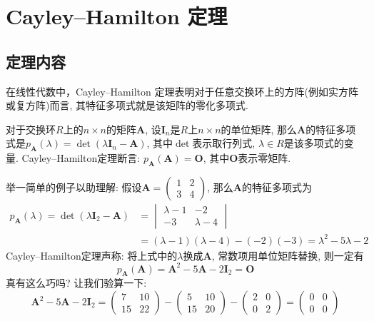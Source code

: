 \documentclass[main]{subfiles}
\begin{document}
\renewcommand{\filename}{No.16Theorem}%
\section{Cayley–Hamilton 定理}
\subsection{定理内容}
在线性代数中，Cayley–Hamilton 定理表明对于任意交换环上的方阵(例如实方阵或复方阵)而言, 其特征多项式就是该矩阵的零化多项式.

对于交换环$R$上的$n\times n$的矩阵$\boldsymbol{A}$, 设$\boldsymbol{I}_n$是$R$上$n\times n$的单位矩阵, 那么$\boldsymbol{A}$的特征多项式是$p_{\boldsymbol{A}}(\lambda)=\det(\lambda \boldsymbol{I}_n-\boldsymbol{A})$, 其中$\det$表示取行列式, $\lambda\in R$是该多项式的变量. Cayley–Hamilton定理断言: $p_{\boldsymbol{A}}(\boldsymbol{A})=\boldsymbol{O}$, 其中$\boldsymbol{O}$表示零矩阵.

举一简单的例子以助理解: 假设$\boldsymbol{A}=\begin{pmatrix}
		1 & 2 \\
		3 & 4
	\end{pmatrix}$, 那么$\boldsymbol{A}$的特征多项式为
\[\begin{aligned}
		p_{\boldsymbol{A}}(\lambda)=\det(\lambda \boldsymbol{I}_2-\boldsymbol{A})
		 & =\begin{vmatrix}
			    \lambda-1 & -2        \\
			    -3        & \lambda-4
		    \end{vmatrix}                                  \\
		 & =(\lambda-1)(\lambda-4)-(-2)(-3)=\lambda^{2}-5\lambda-2
	\end{aligned}\]
Cayley–Hamilton定理声称: 将上式中的$\lambda$换成$\boldsymbol{A}$, 常数项用单位矩阵替换, 则一定有
\[p_{\boldsymbol{A}}(\boldsymbol{A})=\boldsymbol{A}^2-5\boldsymbol{A}-2\boldsymbol{I}_2=\boldsymbol{O}\]
真有这么巧吗? 让我们验算一下:
\[\boldsymbol{A}^2-5\boldsymbol{A}-2\boldsymbol{I}_2=\begin{pmatrix}
		7  & 10 \\
		15 & 22
	\end{pmatrix}
	-\begin{pmatrix}
		5  & 10 \\
		15 & 20
	\end{pmatrix}
	-\begin{pmatrix}
		2 & 0 \\
		0 & 2
	\end{pmatrix}
	=\begin{pmatrix}
		0 & 0 \\
		0 & 0
	\end{pmatrix}\]
\end{document}
